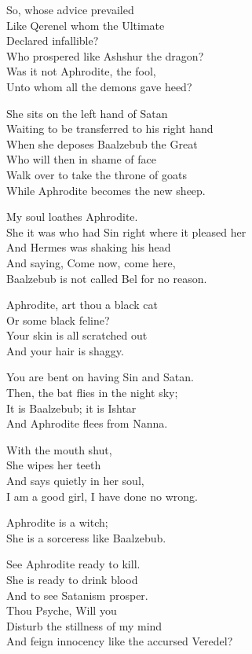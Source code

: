 \documentclass[
]{book}
\begin{document}
So, whose advice prevailed\\
Like Qerenel whom the Ultimate\\
Declared infallible?\\
Who prospered like Ashshur the dragon?\\
Was it not Aphrodite, the fool,\\
Unto whom all the demons gave heed?

She sits on the left hand of Satan\\
Waiting to be transferred to his right hand\\
When she deposes Baalzebub the Great\\
Who will then in shame of face\\
Walk over to take the throne of goats\\
While Aphrodite becomes the new sheep.

My soul loathes Aphrodite.\\
She it was who had Sin right where it pleased her\\
And Hermes was shaking his head\\
And saying, Come now, come here,\\
Baalzebub is not called Bel for no reason.

Aphrodite, art thou a black cat\\
Or some black feline?\\
Your skin is all scratched out\\
And your hair is shaggy.

You are bent on having Sin and Satan.\\
Then, the bat flies in the night sky;\\
It is Baalzebub; it is Ishtar\\
And Aphrodite flees from Nanna.

With the mouth shut,\\
She wipes her teeth\\
And says quietly in her soul,\\
I am a good girl, I have done no wrong.

Aphrodite is a witch;\\
She is a sorceress like Baalzebub.

See Aphrodite ready to kill.\\
She is ready to drink blood\\
And to see Satanism prosper.\\
Thou Psyche, Will you\\
Disturb the stillness of my mind\\
And feign innocency like the accursed Veredel?
\end{document}
